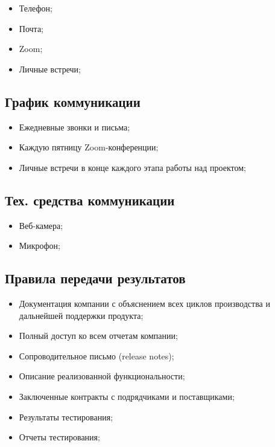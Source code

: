 \documentclass[a4paper,8pt]{article}
\begin{document}
    \begin{itemize}
        \item Телефон;
        \item Почта;
        \item Zoom;
        \item Личные встречи;
    \end{itemize}

\subsection{График коммуникации}

    \begin{itemize}
        \item Ежедневные звонки и письма;
        \item Каждую пятницу Zoom-конференции;
        \item Личные встречи в конце каждого этапа работы над проектом;
    \end{itemize}

\subsection{Тех. средства коммуникации}

    \begin{itemize}
        \item Веб-камера;
        \item Микрофон;
    \end{itemize}


\subsection{Правила передачи результатов}

    \begin{itemize}
        \item Документация компании с объяснением всех циклов производства и дальнейшей поддержки продукта;
        \item Полный доступ ко всем отчетам компании;
        \item Сопроводительное письмо (release notes);
        \item Описание реализованной функциональности;
        \item Заключенные контракты с подрядчиками и поставщиками;
        \item Результаты тестирования;
        \item Отчеты тестирования;
    \end{itemize}
\end{document}
